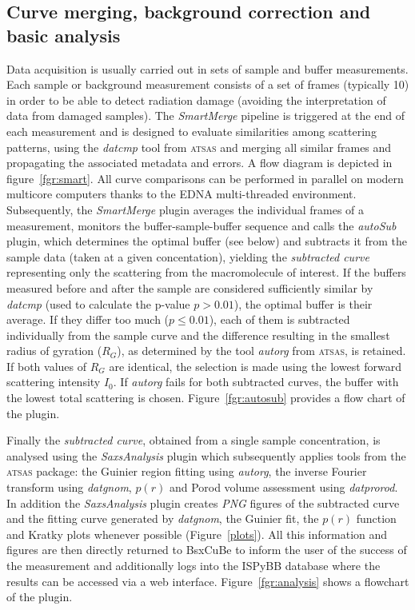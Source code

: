 \documentclass[preprint,pdf]{iucr}              %
\begin{document}
\subsection{Curve merging, background correction and basic analysis}
\label{SM}
Data acquisition is usually carried out in sets of sample and buffer
measurements.
Each sample or background measurement consists of a set of frames
(typically 10) in order to be able to detect radiation damage
(avoiding the interpretation of data from damaged samples).
The \textit{SmartMerge} pipeline is triggered at the end of each measurement
and is designed to evaluate similarities among scattering
patterns, using the \textit{datcmp} tool from \textsc{atsas} and merging all
similar frames and propagating the associated metadata and
errors.
A flow diagram is depicted in figure~\ref{fgr:smart}.
All curve comparisons can be performed in parallel on modern multicore
computers thanks to the EDNA multi-threaded environment.
Subsequently, the \textit{SmartMerge} plugin averages the individual frames
of a measurement, monitors the buffer-sample-buffer sequence and
calls the \textit{autoSub} plugin, which determines the optimal buffer
(see below) and subtracts it from the sample data (taken at a given
concentation), yielding the \textit{subtracted curve} representing only the
scattering from the macromolecule of interest.
If the buffers measured before and after the sample are considered sufficiently
similar by \textit{datcmp} (used to calculate the p-value $p > 0.01$), the
optimal buffer is their average.
If they differ too much ($p \leq 0.01$), each of them is subtracted individually from the
sample curve and the difference resulting in  the smallest radius of
gyration ($R_{G}$), as determined by the tool \textit{autorg} from \textsc{atsas}, is retained.
If both values of $R_{G}$ are identical, the selection is made using the lowest forward scattering intensity $I_{0}$.
If \textit{autorg} fails for both subtracted curves, the buffer with the lowest
total scattering is chosen.
Figure~\ref{fgr:autosub} provides a flow chart of the plugin.

Finally the \textit{subtracted curve}, obtained from a single sample
concentration, is analysed using the \textit{SaxsAnalysis} plugin which
subsequently applies tools from the \textsc{atsas} package: the Guinier region fitting using \textit{autorg}, 
the inverse Fourier transform using \textit{datgnom}, 
$p(r)$ and Porod volume assessment using \textit{datprorod}.
In addition the \textit{SaxsAnalysis} plugin creates \textit{PNG} figures of
the subtracted curve and the fitting curve generated by \textit{datgnom}, the
Guinier fit, the $p(r)$ function and Kratky plots whenever possible (Figure~\ref{plots}).
All this information and figures are then directly returned to BsxCuBe to inform
the user of the success of the measurement and additionally logs into the
ISPyBB database \cite{ISPYBB} where the results can be accessed via a web
interface.
Figure~\ref{fgr:analysis} shows a flowchart of the plugin.
\end{document}
